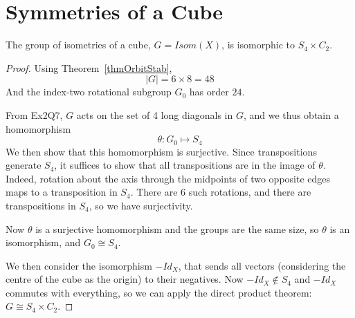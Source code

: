 \documentclass[../Main.tex]{subfiles}
\begin{document}
\section{Symmetries of a Cube}
\begin{lemma}
    The group of isometries of a cube, $G = Isom(X)$, is isomorphic to $S_4 \times C_2$.
\end{lemma}
\begin{proof}
    Using Theorem~\ref{thmOrbitStab},
    \begin{equation*}
        |G| = 6 \times 8 = 48
    \end{equation*}
    And the index-two rotational subgroup $G_0$ has order $24$.\par
    From Ex2Q7, $G$ acts on the set of 4 long diagonals in $G$, and we thus obtain a homomorphism
    \begin{equation*}
        \theta : G_0 \mapsto S_4
    \end{equation*}
    We then show that this homomorphism is surjective. Since transpositions generate $S_4$, it suffices to show that all transpositions are in the image of $\theta$. Indeed, rotation about the axis through the midpoints of two opposite edges maps to a transposition in $S_4$. There are 6 such rotations, and there are transpositions in $S_4$, so we have surjectivity.\par
    Now $\theta$ is a surjective homomorphism and the groups are the same size, so $\theta$ is an isomorphism, and $G_0 \cong S_4$.\par
    We then consider the isomorphism $-Id_X$, that sends all vectors (considering the centre of the cube as the origin) to their negatives. Now $-Id_X \notin S_4$ and $-Id_X$ commutes with everything, so we can apply the direct product theorem: $G \cong S_4 \times C_2$.
\end{proof}
\end{document}
